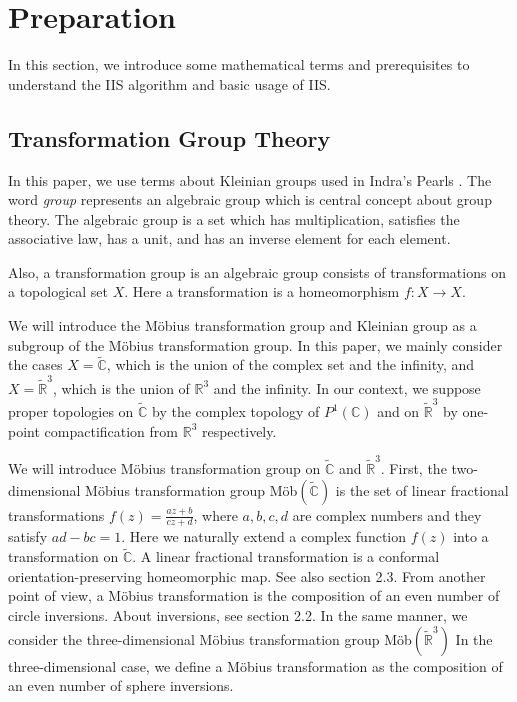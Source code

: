 
\section{Preparation}

In this section, we introduce some mathematical terms and prerequisites
to understand the IIS algorithm and basic usage of IIS.

\subsection{Transformation Group Theory}

In this paper, we use terms about Kleinian groups used in Indra's
Pearls \cite{MumfordSeriesWright200204}.
The word \textit{group} represents an algebraic group which is
central concept about group theory.
The algebraic group is a set which has multiplication, satisfies the
associative law, has a unit, and has an inverse element for each
element.

Also, a transformation group is an algebraic group consists of transformations 
on a topological set $X$.  Here a transformation is a homeomorphism
$f:X \to X$.

We will introduce the M\"obius transformation group and Kleinian group
as a subgroup of the M\"obius transformation group. 
In this paper, we mainly consider the cases $X=\tilde{\mathbb{C}}$,
which is the union of the complex set and the infinity, 
and $X=\tilde{ \mathbb{R} }^3$, which is the union of $\mathbb{R}^3$ and the infinity.
In our context, we suppose proper topologies on $\tilde{\mathbb{C}}$ 
by the complex topology of $P^1(\mathbb{C})$ and on $\tilde{ \mathbb{R} }^3$
by one-point compactification from $\mathbb{R}^3$ respectively.

We will introduce M\"obius transformation group on $\tilde{\mathbb{C}}$ and $\tilde{ \mathbb{R} }^3$.  
First, the two-dimensional M\"obius transformation group
\textrm{M\"ob}$(\tilde{\mathbb{C}})$ is the set of linear fractional transformations $f(z)=\frac{az+b}{cz+d}$, 
where $a,b,c,d$ are complex numbers and they satisfy $ad-bc = 1$. Here we naturally extend a complex function $f(z)$ 
into a transformation on $\tilde{\mathbb{C}}$.  
A linear fractional transformation is a conformal orientation-preserving homeomorphic map.
See also section 2.3.
From another point of view, a M\"obius transformation is the composition
of an even number of circle inversions.  
About inversions, see section 2.2.
In the same manner, we consider the three-dimensional M\"obius
transformation group \textrm{M\"ob}$(\tilde{\mathbb{R}}^3)$
In the three-dimensional case, we define a M\"obius transformation as
the composition of an even number of sphere inversions.

